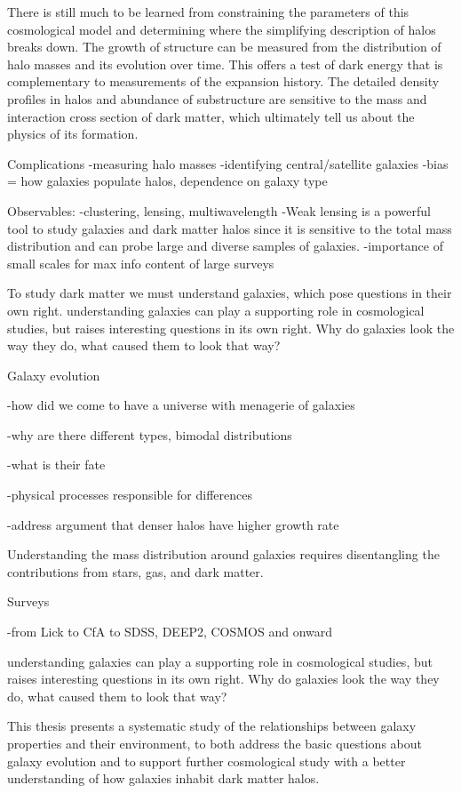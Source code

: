 There is still much to be learned from constraining the parameters of
this cosmological model and determining where the simplifying
description of halos breaks down. The growth of structure can be
measured from the distribution of halo masses and its evolution over
time. This offers a test of dark energy that is complementary to
measurements of the expansion history.  The detailed density profiles
in halos and abundance of substructure are sensitive to the mass and
interaction cross section of dark matter, which ultimately tell us
about the physics of its formation.

Complications
-measuring halo masses
-identifying central/satellite galaxies
-bias = how galaxies populate halos, dependence on galaxy type

Observables:
-clustering, lensing, multiwavelength
-Weak lensing is a powerful tool to study galaxies and dark matter
halos since it is sensitive to the total mass distribution and can
probe large and diverse samples of galaxies. 
-importance of small scales for max info content of large surveys


To study dark matter we must understand galaxies, which pose questions
in their own right.
understanding galaxies can play a supporting role in cosmological
studies, but raises interesting questions in its own right. Why do
galaxies look the way they do, what caused them to look that way?

Galaxy evolution

-how did we come to have a universe with menagerie of galaxies

-why are there different types, bimodal distributions

-what is their fate

-physical processes responsible for differences

-address argument that denser halos have higher growth rate

Understanding the mass distribution around
galaxies requires disentangling the contributions from stars, gas, and
dark matter.


Surveys

-from Lick to CfA to SDSS, DEEP2, COSMOS and onward


understanding galaxies can play a supporting role in cosmological
studies, but raises interesting questions in its own right. Why do
galaxies look the way they do, what caused them to look that way?




This thesis presents a systematic study of the relationships between
galaxy properties and their environment, to both address the basic
questions about galaxy evolution and to support further cosmological
study with a better understanding of how galaxies inhabit dark matter
halos.



